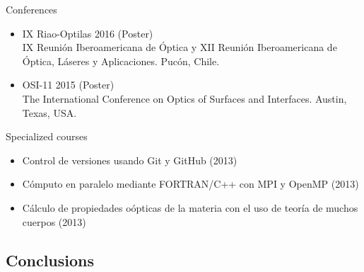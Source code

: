 \documentclass{beamer}
\begin{document}
\begin{frame}
\begin{columns}
\end{columns}

\end{frame}




\begin{frame}

{\Large Conferences}

\begin{itemize}

\item IX Riao-Optilas 2016 (Poster)\\
\footnotesize{IX Reuni\'on Iberoamericana de \'Optica y XII Reuni\'on
Iberoamericana de \'Optica, L\'aseres y Aplicaciones. Puc\'on, Chile.}

\item OSI-11 2015 (Poster) \\
\footnotesize{The International Conference on Optics of Surfaces and
Interfaces. Austin, Texas, USA.}

\end{itemize}

\vspace{7mm}

{\Large Specialized courses}

\begin{itemize}

\item Control de versiones usando Git y GitHub (2013)
\item C\'omputo en paralelo mediante FORTRAN/C++ con MPI y OpenMP (2013)
\item C\'alculo de propiedades o\'opticas de la materia con el uso de teor\'ia
de muchos cuerpos (2013)

\end{itemize}


\end{frame}




\subsection{Conclusions}


\end{document}
